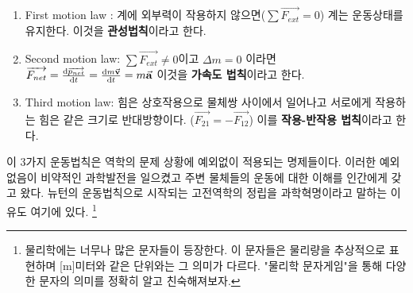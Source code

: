 \begin{flushleft}
\begin{defn}
  \begin{enumerate}
  \item First motion law : 계에 외부력이 작용하지 않으면($\sum \overrightarrow{F_{ext}} = 0$) 계는 운동상태를 유지한다. 이것을 \textbf{관성법칙}이라고 한다.
  \item Second motion law: $\sum \overrightarrow{F_{ext}} \neq 0$이고 $\Delta m =0$ 이라면   $\overrightarrow{F_{net}}
      =\dv{\overrightarrow{p_{net}}}{t} =\dv{m \va{v}}{t}= m\va{a}$ 이것을 \textbf{가속도 법칙}이라고 한다.
  \item Third motion law: 힘은 상호작용으로 물체쌍 사이에서 일어나고 서로에게 작용하는 힘은 같은 크기로 반대방향이다. 
  ($\overrightarrow{F_{21}}=-\overrightarrow{F_{12}}$) 이를 \textbf{작용-반작용 법칙}이라고 한다.
\end{enumerate}
\end{defn}

이 3가지 운동법칙은 역학의 문제 상황에 예외없이 적용되는 명제들이다. 
이러한 예외없음이 비약적인 과학발전을 일으켰고 주변 물체들의 운동에 대한 이해를 인간에게 갖고 왔다. 
뉴턴의 운동법칙으로 시작되는 고전역학의 정립을
과학혁명이라고 말하는 이유도 여기에 있다. \footnote{물리학에는 
너무나 많은 문자들이 등장한다. 이 문자들은 물리량을 추상적으로 표현하며 [m]미터와 같은 단위와는 그 의미가 다르다. 
"물리학 문자게임"을 통해 다양한 문자의 의미를 정확히 알고 친숙해져보자.} 

\end{flushleft}
